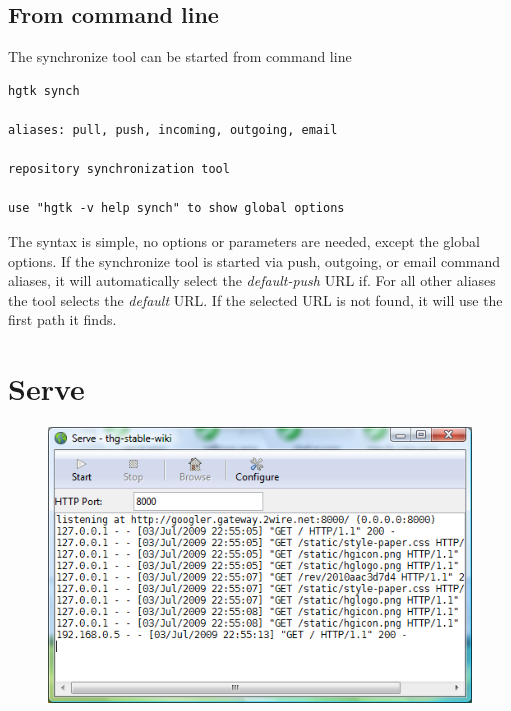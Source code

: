 \documentclass[letterpaper,10pt,english]{manual}
\begin{document}
\subsection{From command line}

The synchronize tool can be started from command line

\begin{Verbatim}[commandchars=@\[\]]
hgtk synch

aliases: pull, push, incoming, outgoing, email

repository synchronization tool

use "hgtk -v help synch" to show global options
\end{Verbatim}

The syntax is simple, no options or parameters are needed, except the
global options.  If the synchronize tool is started via push, outgoing,
or email command aliases, it will automatically select the
\emph{default-push} URL if.  For all other aliases the tool selects the
\emph{default} URL.  If the selected URL is not found, it will use the first
path it finds.

\resetcurrentobjects
\hypertarget{--doc-serve}{}

\section{Serve}
\hypertarget{module-serve.dialog}{}
\begin{figure}[htbp]
\centering

\includegraphics{serve.png}
\end{figure}
\end{document}
